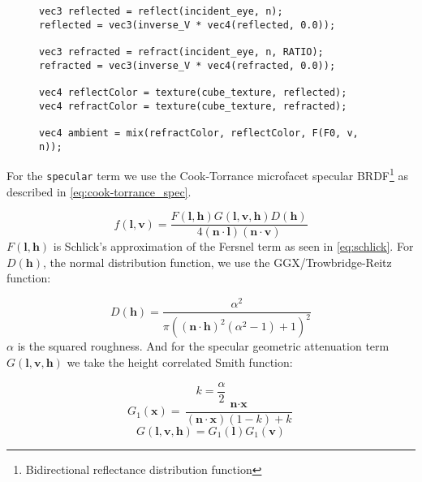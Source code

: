 \begin{figure}[ht!]
\begin{lstlisting}
vec3 reflected = reflect(incident_eye, n);
reflected = vec3(inverse_V * vec4(reflected, 0.0));

vec3 refracted = refract(incident_eye, n, RATIO);
refracted = vec3(inverse_V * vec4(refracted, 0.0));

vec4 reflectColor = texture(cube_texture, reflected);
vec4 refractColor = texture(cube_texture, refracted);

vec4 ambient = mix(refractColor, reflectColor, F(F0, v, n));
\end{lstlisting}
\end{figure}

For the \texttt{specular} term we use the Cook-Torrance microfacet specular
BRDF\footnote{Bidirectional reflectance distribution function} as
described in \autoref{eq:cook-torrance_spec}.

\begin{equation}\label{eq:cook-torrance_spec}
    f(\textbf{l}, \textbf{v}) ={} \frac{F(\textbf{l}, \textbf{h})
        G(\textbf{l}, \textbf{v}, \textbf{h}) D(\textbf{h})}{4
    (\textbf{n} \cdot \textbf{l}) (\textbf{n} \cdot \textbf{v})}
\end{equation}
%
$F(\textbf{l}, \textbf{h})$ is Schlick's approximation of the Fersnel term as
seen in \autoref{eq:schlick}. For $D(\textbf{h})$, the normal distribution
function, we use the GGX/Trowbridge-Reitz function:

\begin{equation}\label{eq:ndf_ggx}
    D(\textbf{h}) ={} \frac{\alpha^2}{\pi{({(\textbf{n} \cdot \textbf{h})}^2
    (\alpha^2 - 1) + 1)}^2}
\end{equation}
%
$\alpha$ is the squared roughness. And for the specular geometric attenuation
term $G(\textbf{l}, \textbf{v}, \textbf{h})$ we take the height correlated Smith
function:

\begin{equation}\label{eq:height_smith}
    k ={} \frac{\alpha}{2}
\end{equation}
\begin{equation}\label{eq:height_smith}
    G_1(\textbf{x}) ={} \frac{\textbf{n} \cdot \textbf{x}}{(\textbf{n} \cdot
    \textbf{x})(1 - k) + k}
\end{equation}
\begin{equation}\label{eq:height_smith}
    G(\textbf{l}, \textbf{v}, \textbf{h}) ={} G_1(\textbf{l}) G_1(\textbf{v})
\end{equation}

